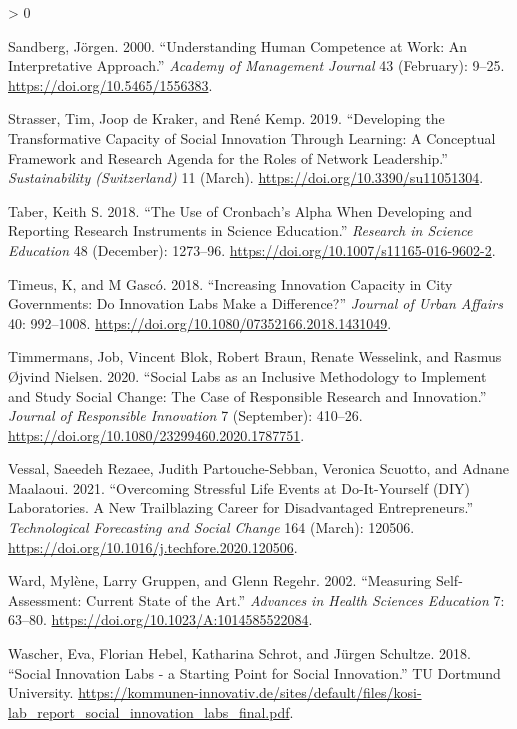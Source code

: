 \documentclass[AMA,STIX1COL,APA,STIX2COL]{WileyNJD-v2}
\newlength{\cslhangindent}
\newenvironment{CSLReferences}[2] %
 {%
  \setlength{\parindent}{0pt}
  \ifodd #1 \everypar{\setlength{\hangindent}{\cslhangindent}}\ignorespaces\fi
  \ifnum #2 > 0
  \setlength{\parskip}{#2\baselineskip}
  \fi
 }%
 {}
\begin{document}
\begin{CSLReferences}{1}{0}
\leavevmode\hypertarget{ref-Sandberg2000}{}%
Sandberg, Jörgen. 2000. {``Understanding Human Competence at Work: An
Interpretative Approach.''} \emph{Academy of Management Journal} 43
(February): 9--25. \url{https://doi.org/10.5465/1556383}.

\leavevmode\hypertarget{ref-Strasser2019}{}%
Strasser, Tim, Joop de Kraker, and René Kemp. 2019. {``Developing the
Transformative Capacity of Social Innovation Through Learning: A
Conceptual Framework and Research Agenda for the Roles of Network
Leadership.''} \emph{Sustainability (Switzerland)} 11 (March).
\url{https://doi.org/10.3390/su11051304}.

\leavevmode\hypertarget{ref-Taber2018}{}%
Taber, Keith S. 2018. {``The Use of Cronbach's Alpha When Developing and
Reporting Research Instruments in Science Education.''} \emph{Research
in Science Education} 48 (December): 1273--96.
\url{https://doi.org/10.1007/s11165-016-9602-2}.

\leavevmode\hypertarget{ref-Timeus2018}{}%
Timeus, K, and M Gascó. 2018. {``Increasing Innovation Capacity in City
Governments: Do Innovation Labs Make a Difference?''} \emph{Journal of
Urban Affairs} 40: 992--1008.
\url{https://doi.org/10.1080/07352166.2018.1431049}.

\leavevmode\hypertarget{ref-Timmermans2020}{}%
Timmermans, Job, Vincent Blok, Robert Braun, Renate Wesselink, and
Rasmus Øjvind Nielsen. 2020. {``Social Labs as an Inclusive Methodology
to Implement and Study Social Change: The Case of Responsible Research
and Innovation.''} \emph{Journal of Responsible Innovation} 7
(September): 410--26.
\url{https://doi.org/10.1080/23299460.2020.1787751}.

\leavevmode\hypertarget{ref-RezaeeVessal2021}{}%
Vessal, Saeedeh Rezaee, Judith Partouche-Sebban, Veronica Scuotto, and
Adnane Maalaoui. 2021. {``Overcoming Stressful Life Events at
Do-It-Yourself (DIY) Laboratories. A New Trailblazing Career for
Disadvantaged Entrepreneurs.''} \emph{Technological Forecasting and
Social Change} 164 (March): 120506.
\url{https://doi.org/10.1016/j.techfore.2020.120506}.

\leavevmode\hypertarget{ref-Ward2002}{}%
Ward, Mylène, Larry Gruppen, and Glenn Regehr. 2002. {``Measuring
Self-Assessment: Current State of the Art.''} \emph{Advances in Health
Sciences Education} 7: 63--80.
\url{https://doi.org/10.1023/A:1014585522084}.

\leavevmode\hypertarget{ref-Wascher2018}{}%
Wascher, Eva, Florian Hebel, Katharina Schrot, and Jürgen Schultze.
2018. {``Social Innovation Labs - a Starting Point for Social
Innovation.''} TU Dortmund University.
\url{https://kommunen-innovativ.de/sites/default/files/kosi-lab_report_social_innovation_labs_final.pdf}.


\end{CSLReferences}
\end{document}
